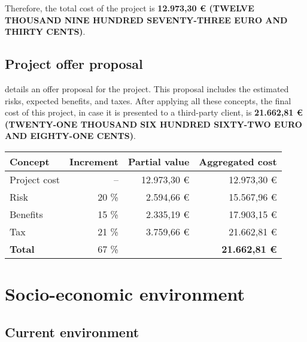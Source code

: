 Therefore, the total cost of the project is \textbf{12.973,30 € (TWELVE THOUSAND NINE HUNDRED SEVENTY-THREE EURO AND THIRTY CENTS)}.


\subsection{Project offer proposal}\label{subsec:offer-proposal}
 details an offer proposal for the project. This proposal includes the estimated risks, expected benefits, and taxes. After applying all these concepts, the final cost of this project, in case it is presented to a third-party client, is \textbf{21.662,81 € (TWENTY-ONE THOUSAND SIX HUNDRED SIXTY-TWO EURO AND EIGHTY-ONE CENTS)}.

\begin{table}[htb]
    {
      \begin{tabular}{lrrr}
        \toprule
        \textbf{Concept} & \textbf{Increment} & \textbf{Partial value} & \textbf{Aggregated cost} \\
        \midrule
        Project cost   & --    & 12.973,30 € & 12.973,30 € \\
        Risk           & 20 \% &  2.594,66 € & 15.567,96 € \\
        Benefits       & 15 \% &  2.335,19 € & 17.903,15 € \\
        Tax            & 21 \% &  3.759,66 € & 21.662,81 € \\
        \midrule
        \textbf{Total} & 67 \% & & \textbf{21.662,81 €} \\
        \bottomrule
      \end{tabular}
    }
\end{table}



\section{Socio-economic environment}\label{sec:environment}

\subsection{Current environment}

